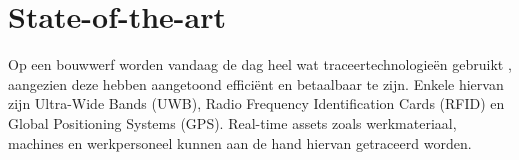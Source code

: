 %
%
%
%


\section{State-of-the-art}%
\label{sec:state-of-the-art}

Op een bouwwerf worden vandaag de dag heel wat traceertechnologieën gebruikt \autocite{Nasr2013}, aangezien deze hebben aangetoond efficiënt en betaalbaar te zijn. Enkele hiervan zijn Ultra-Wide Bands (UWB), Radio Frequency Identification Cards (RFID) en Global Positioning Systems (GPS). Real-time assets zoals werkmateriaal, machines en werkpersoneel kunnen aan de hand hiervan getraceerd worden. 

